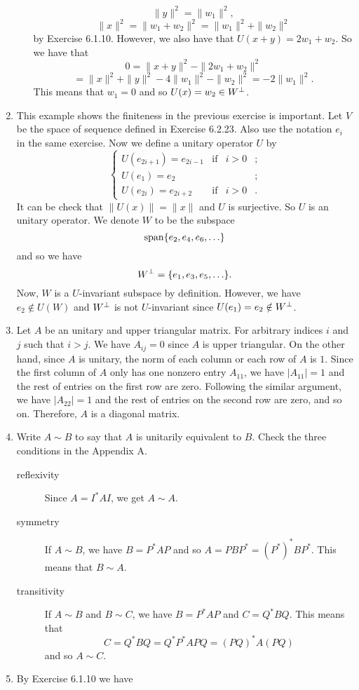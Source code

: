 \begin{enumerate}
\begin{enumerate}
\[\|y\|^2=\|w_1\|^2,\]
\[\|x\|^2=\|w_1+w_2\|^2=\|w_1\|^2+\|w_2\|^2\]
by Exercise 6.1.10. However, we also have that $U(x+y)=2w_1+w_2$. So we have that 
\[0=\|x+y\|^2-\|2w_1+w_2\|^2\]
\[=\|x\|^2+\|y\|^2-4\|w_1\|^2-\|w_2\|^2=-2\|w_1\|^2.\]
This means that $w_1=0$ and so $U(x)=w_2\in W\pp$.
\end{enumerate}
\item This example shows the finiteness in the previous exercise is important. Let $V$ be the space of sequence defined in Exercise 6.2.23. Also use the notation $e_i$ in the same exercise. Now we define a unitary operator $U$ by 
\[\left\{\begin{array}{llll}U(e_{2i+1})=e_{2i-1}&\mathrm{if} &i>0 &;\\U(e_1)=e_2&&&;\\U(e_{2i})=e_{2i+2}&\mathrm{if}&i>0&.\end{array}\right.\]
It can be check that $\|U(x)\|=\|x\|$ and $U$ is surjective. So $U$ is an unitary operator. We denote $W$ to be the subspace 
\[\sp\{e_2,e_4,e_6, \ldots\}\]
and so we have 
\[W\pp=\{e_1,e_3,e_5,\ldots \}.\]
Now, $W$ is a $U$-invariant subspace by definition. However, we have $e_2\notin U(W)$ and $W\pp$ is not $U$-invariant since $U(e_1)=e_2\notin W\pp$.
\item Let $A$ be an unitary and upper triangular matrix. For arbitrary indices $i$ and $j$ such that $i> j$. We have $A_{ij}=0$ since $A$ is upper triangular.  On the other hand, since $A$ is unitary, the norm of each column or each row of $A$ is $1$.  Since the first column of $A$ only has one nonzero entry $A_{11}$, we have $|A_{11}| = 1$ and the rest of entries on the first row are zero.  Following the similar argument, we have $|A_{22}| = 1$ and the rest of entries on the second row are zero, and so on.  Therefore, $A$ is a diagonal matrix.
\item Write $A\sim B$ to say that $A$ is unitarily equivalent to $B$. Check the three conditions in the Appendix A. \begin{description}
\item[reflexivity] Since $A=I^*AI$, we get $A\sim A$.
\item[symmetry]  If $A\sim B$, we have $B=P^*AP$ and so $A=PBP^*=(P^*)^*BP^*$. This means that $B\sim A$.
\item[transitivity] If $A\sim B$ and $B\sim C$, we have $B=P^*AP$ and $C=Q^*BQ$. This means that 
\[C=Q^*BQ=Q^*P^*APQ=(PQ)^*A(PQ)\]
and so $A\sim C$.
\end{description}
\item By Exercise 6.1.10 we have 

\end{enumerate}
